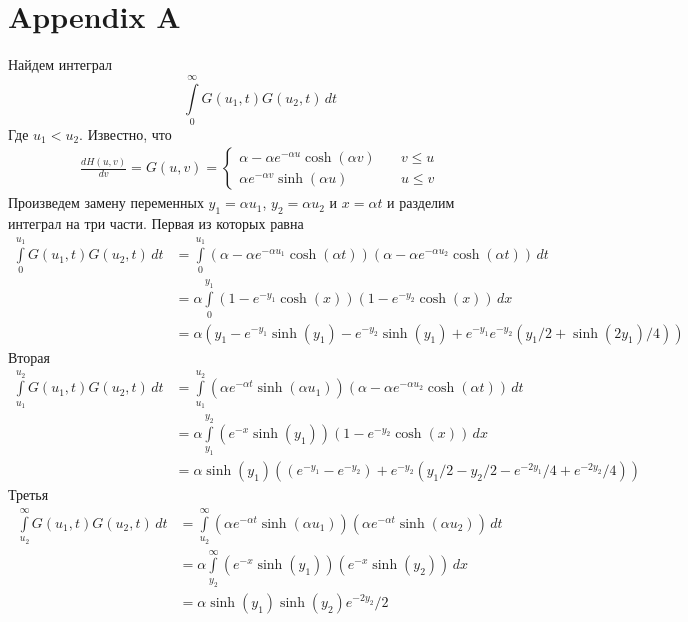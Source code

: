 \documentclass[10pt]{article}
\theoremstyle{definition}
\theoremstyle{remark}
\theoremstyle{plain}
\begin{document}
\section*{Appendix A}
Найдем интеграл
$$
\int\limits_0^{\infty}G(u_1,t)G(u_2,t)\,dt
$$
Где $u_1<u_2$. Известно, что 
\begin{align*}
\frac{dH(u,v)}{dv} = G(u,v) =
\left\{
	\begin{aligned}
	\alpha - \alpha	e^{-\alpha u} \cosh(\alpha v)&\quad v\leqslant u \\
	\alpha e^{-\alpha v}\sinh(\alpha u) &\quad u\leqslant v
	\end{aligned}
\right.
\end{align*}
Произведем замену переменных $y_1 = \alpha u_1$, $y_2 = \alpha u_2$ и $x = \alpha t$ и разделим интеграл на три части. Первая из которых равна
\begin{align*}
\int\limits_0^{u_1}G(u_1,t)G(u_2,t)\,dt &= 
\int\limits_0^{u_1} 
	\left(\alpha - \alpha	e^{-\alpha u_1} \cosh(\alpha t)\right)
	\left(\alpha - \alpha	e^{-\alpha u_2} \cosh(\alpha t)\right)
\,dt 
\\
&= 
\alpha \int\limits_0^{y_1} 
	\left(1 - e^{-y_1} \cosh(x)\right)
	\left(1 - e^{-y_2} \cosh(x)\right)
\,dx
\\
&=
\alpha\left(y_1 - e^{-y_1}\sinh(y_1) - e^{-y_2}\sinh(y_1) 
	+ e^{-y_1}e^{-y_2}(y_1/2 + \sinh(2y_1)/4)\right)
\end{align*}
Вторая
\begin{align*}
\int\limits_{u_1}^{u_2}G(u_1,t)G(u_2,t)\,dt &= 
\int\limits_{u_1}^{u_2}
	\left(\alpha e^{-\alpha t}\sinh(\alpha u_1) \right)
	\left(\alpha - \alpha	e^{-\alpha u_2} \cosh(\alpha t)\right)
\,dt 
\\
&= \alpha \int\limits_{y_1}^{y_2} 
	\left(e^{-x} \sinh(y_1)\right)
	\left(1 - e^{-y_2} \cosh(x)\right)
\,dx
\\
&= \alpha\sinh(y_1)\left(
	(e^{-y_1}-e^{-y_2})+
	e^{-y_2}(y_1/2-y_2/2 - e^{-2y_1}/4 + e^{-2y_2}/4)
\right)
\end{align*}
Третья
\begin{align*}
\int\limits_{u_2}^{\infty}G(u_1,t)G(u_2,t)\,dt &= 
\int\limits_{u_2}^{\infty}
	\left(\alpha e^{-\alpha t}\sinh(\alpha u_1) \right)
	\left(\alpha e^{-\alpha t}\sinh(\alpha u_2) \right)
\,dt 
\\
&= \alpha \int\limits_{y_2}^{\infty} 
	\left(e^{-x} \sinh(y_1)\right)
	\left(e^{-x} \sinh(y_2)\right)
\,dx
\\
&= \alpha\sinh(y_1)\sinh(y_2)e^{-2y_2}/2
\end{align*}
\end{document}
